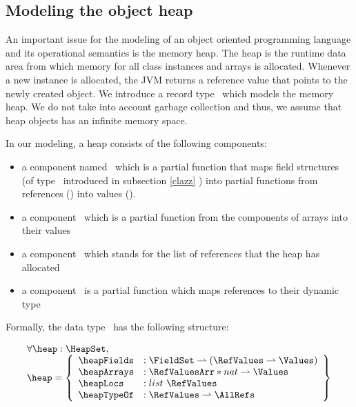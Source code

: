 \index{\HeapSet}
\index{\heap}
\index{\heapArrays}
\index{\heapArrays} 
\index{\heapTypeOf}

 \subsection{Modeling the object heap} \label{heap}
 An important issue for the modeling of an object oriented programming language and its operational semantics
 is the memory heap. The heap is the
 runtime data area from which memory  for all class instances and arrays is allocated. Whenever a new instance
 is allocated, the JVM returns a reference value that points to the newly created object. 
 We introduce a record type \HeapSet \ which models the memory heap. We do not take into account 
 garbage collection and thus, we assume that heap objects has an infinite memory space. 
 
 In our modeling, a heap consists of the following components:
 \begin{itemize}
       \item a component  named \heapFields \ which is a partial function that maps field
             structures (of type \FieldSet \ introduced in subsection \ref{clazz} ) into partial functions from references (\AllRefs)
	     into values (\Values).  
 

       \item  a component \heapArrays \ which is a partial function from the components of arrays  into their values

       \item  a component  \heapLocs  \ which stands for the  list of references that the heap has allocated  
              
       \item  a component \heapTypeOf   \ is a partial function  which maps references to their dynamic type 
 \end{itemize}


 Formally, the data type \HeapSet \ has the following structure:



  $$ \begin{array}{l}
         \forall  \heap : \HeapSet , \\
         \heap = \left\{\begin{array}{ll}  \heapFields  &  : \FieldSet \rightharpoonup (  \RefValues \rightharpoonup \Values) \\
                                           \heapArrays  &  : \RefValuesArr * nat \rightharpoonup \Values \\
					   \heapLocs    &  : list \ \RefValues \\
					   \heapTypeOf  &  : \RefValues \rightharpoonup \AllRefs
                    \end{array} \right\}
   \end{array} $$


